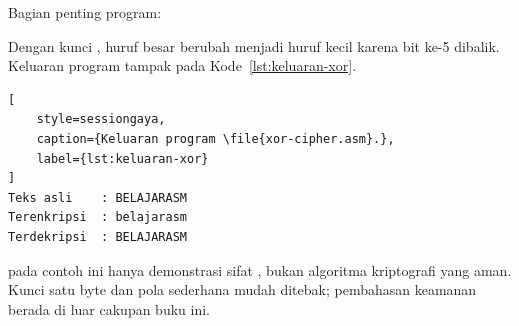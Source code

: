 

Bagian penting program:


Dengan kunci , huruf besar berubah menjadi huruf kecil
karena bit ke-5 dibalik. Keluaran program tampak pada
Kode~\ref{lst:keluaran-xor}.

\begin{lstlisting}[
    style=sessiongaya,
    caption={Keluaran program \file{xor-cipher.asm}.},
    label={lst:keluaran-xor}
]
Teks asli    : BELAJARASM
Terenkripsi  : belajarasm
Terdekripsi  : BELAJARASM
\end{lstlisting}

\begin{infobox}
\vspace{1.1em}
 pada contoh ini hanya demonstrasi sifat ,
bukan algoritma kriptografi yang aman. Kunci satu byte dan pola
sederhana mudah ditebak; pembahasan keamanan berada di luar cakupan
buku ini.
\end{infobox}
